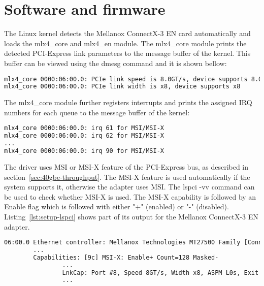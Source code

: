 
\section{Software and firmware}
The Linux kernel detects the Mellanox ConnectX-3 EN card automatically and loads the mlx4\_core and mlx4\_en module.
The mlx4\_core module prints the detected PCI-Express link parameters to the message buffer of the kernel.
This buffer can be viewed using the dmesg command and it is shown bellow:
\begin{lstlisting}[language=TeX]
mlx4_core 0000:06:00.0: PCIe link speed is 8.0GT/s, device supports 8.0GT/s
mlx4_core 0000:06:00.0: PCIe link width is x8, device supports x8
\end{lstlisting}
The mlx4\_core module further registers interrupts and prints the assigned IRQ numbers for each queue
to the message buffer of the kernel:
\begin{lstlisting}[language=TeX]
mlx4_core 0000:06:00.0: irq 61 for MSI/MSI-X
mlx4_core 0000:06:00.0: irq 62 for MSI/MSI-X
...
mlx4_core 0000:06:00.0: irq 90 for MSI/MSI-X
\end{lstlisting}

The driver uses MSI or MSI-X feature of the PCI-Express bus, as described in section~\ref{sec:40gbe-throughput}.
The MSI-X feature is used automatically if the system supports it, otherwise the adapter uses MSI.
The lspci -vv command can be used to check whether MSI-X is used.
The MSI-X capability is followed by an Enable flag which is followed with either "+" (enabled)
or "-" (disabled).
Listing~\ref{lst:setup-lspci} shows part of its output for the Mellanox ConnectX-3 EN adapter.
\begin{lstlisting}[language=TeX,label={lst:setup-lspci},caption={Partial output of lspci -vv for Mellanox ConnectX-3 EN}]
06:00.0 Ethernet controller: Mellanox Technologies MT27500 Family [ConnectX-3]
		...
		Capabilities: [9c] MSI-X: Enable+ Count=128 Masked-
				...
				LnkCap: Port #8, Speed 8GT/s, Width x8, ASPM L0s, Exit Latency L0s unlimited, L1 unlimited
				...
\end{lstlisting}



